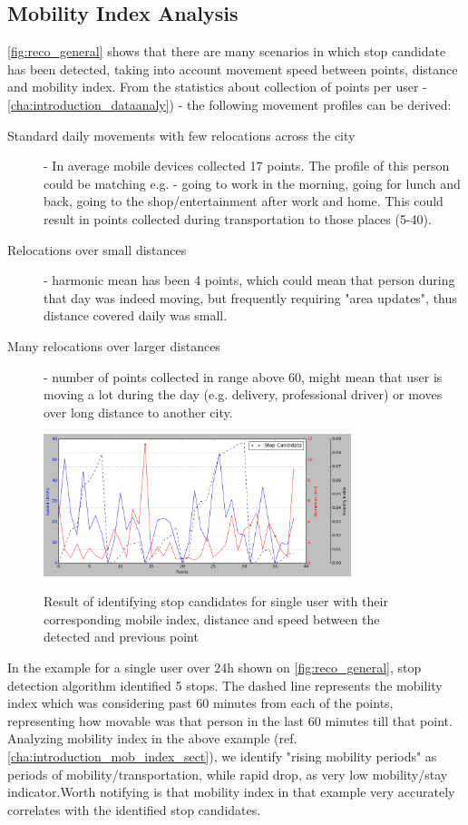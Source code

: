 \subsection{Mobility Index Analysis}

\autoref{fig:reco_general} shows that there are many scenarios in which stop candidate has been detected, taking into account movement speed between points, distance and mobility index. From the statistics about collection of points per user - \autoref{cha:introduction_dataanaly}) - the following movement profiles can be derived:
\\
\begin{description}
	\item[Standard daily movements with few relocations across the city] - In average mobile devices collected 17 points. The profile of this person could be matching e.g. - going to work in the morning, going for lunch and back, going to the shop/entertainment after work and home. This could result in points collected during transportation to those places (5-40). 
	\item[Relocations over small distances] - harmonic mean has been 4 points, which could mean that person during that day was indeed moving, but frequently requiring "area updates", thus distance covered daily was small. 
	\item[Many relocations over larger distances] - number of points collected in range above 60, might mean that user is moving a lot during the day (e.g. delivery, professional driver) or moves over long distance to another city. 
\end{description}
\begin{figure}[!ht]
	\centering
	\includegraphics[width=0.8\textwidth]{images/reco_general.png}\\
	\caption{Result of identifying stop candidates for single user with their corresponding mobile index, distance and speed between the detected and previous point }
	\label{fig:reco_general}
\end{figure}
In the example for a single user over 24h shown on \autoref{fig:reco_general}, stop detection algorithm identified 5 stops. The dashed line represents the mobility index which was considering past 60 minutes from each of the points, representing how movable was that person in the last 60 minutes till that point. Analyzing mobility index in the above example (ref. \autoref{cha:introduction_mob_index_sect}), we identify "rising mobility periods" as periods of mobility/transportation, while rapid drop, as very low mobility/stay indicator.Worth notifying is that mobility index in that example very accurately correlates with the identified stop candidates. 
